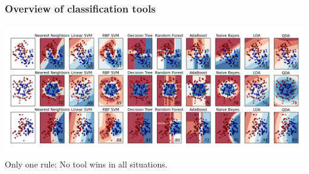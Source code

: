 
\begin{frame}
\frametitle{Overview of classification tools}
\hspace*{-1cm}
\includegraphics[width=1.2\textwidth]{sklearn_material/plot_classifier_comparison_001.png}\\
Only one rule: No tool wins in all situations. 
\end{frame}


